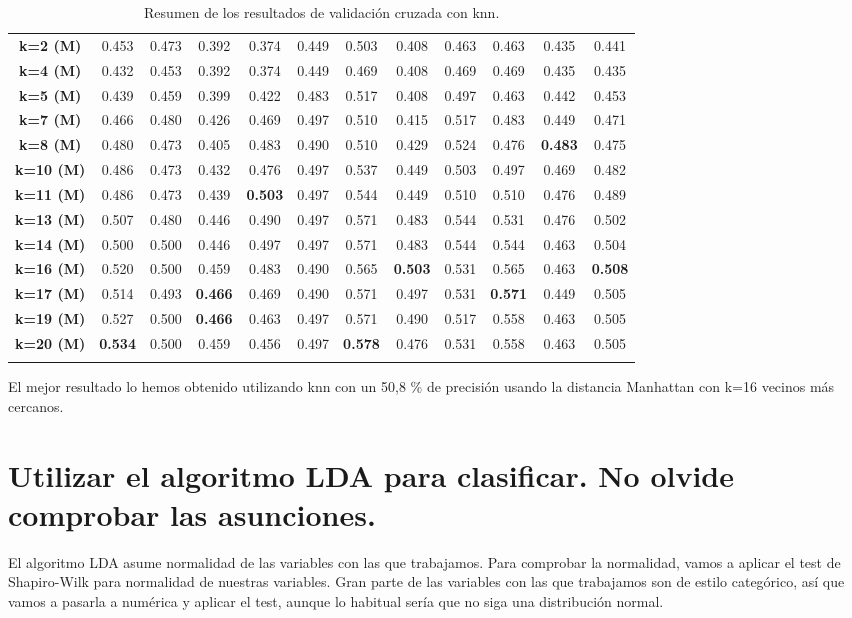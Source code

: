 \documentclass[a4paper,12pt, oneside]{book}
\begin{document}
\begin{longtable}{@{}cccccccccccc@{}}
\\
\textbf{k=2 (M)}   & 0.453 & 0.473 & 0.392 & 0.374 & 0.449 & 0.503 & 0.408 & 0.463 & 0.463 & 0.435 & 0.441
\\
\textbf{k=4 (M)}  & 0.432 & 0.453 & 0.392 & 0.374 & 0.449 & 0.469 & 0.408 & 0.469 & 0.469 & 0.435 & 0.435
 \\
\textbf{k=5 (M)}   & 0.439 & 0.459 & 0.399 & 0.422 & 0.483 & 0.517 & 0.408 & 0.497 & 0.463 & 0.442 & 0.453
\\
\textbf{k=7 (M)}   & 0.466 & 0.480 & 0.426 & 0.469 & 0.497 & 0.510 & 0.415 & 0.517 & 0.483 & 0.449 & 0.471
\\
\textbf{k=8 (M)}   & 0.480 & 0.473 & 0.405 & 0.483 & 0.490 & 0.510 & 0.429 & 0.524 & 0.476 & \textbf{0.483} & 0.475
\\
\textbf{k=10 (M)}  & 0.486 & 0.473 & 0.432 & 0.476 & 0.497 & 0.537 & 0.449 & 0.503 & 0.497 & 0.469 & 0.482
 \\
\textbf{k=11 (M)}   & 0.486 & 0.473 & 0.439 & \textbf{0.503} & 0.497 & 0.544 & 0.449 & 0.510 & 0.510 & 0.476 & 0.489
\\
\textbf{k=13 (M)}   & 0.507 & 0.480 & 0.446 & 0.490 & 0.497 & 0.571 & 0.483 & 0.544 & 0.531 & 0.476 & 0.502
\\
\textbf{k=14 (M)}  & 0.500 & 0.500 & 0.446 & 0.497 & 0.497 & 0.571 & 0.483 & 0.544 & 0.544 & 0.463 & 0.504
 \\
\textbf{k=16 (M)}  & 0.520 & 0.500 & 0.459 & 0.483 & 0.490 & 0.565 & \textbf{0.503} & 0.531 & 0.565 & 0.463 & \textbf{0.508}
 \\
\textbf{k=17 (M)}   & 0.514 & 0.493 & \textbf{0.466} & 0.469 & 0.490 & 0.571 & 0.497 & 0.531 & \textbf{0.571} & 0.449 & 0.505
\\
\textbf{k=19 (M)}   & 0.527 & 0.500 & \textbf{0.466} & 0.463 & 0.497 & 0.571 & 0.490 & 0.517 & 0.558 & 0.463 & 0.505
\\
\textbf{k=20 (M)}  & \textbf{0.534} & 0.500 & 0.459 & 0.456 & 0.497 & \textbf{0.578} & 0.476 & 0.531 & 0.558 & 0.463 & 0.505 \\* \bottomrule
\caption{Resumen de los resultados de validación cruzada con knn.}
\label{tab:knnclass}\\


\end{longtable}
\normalsize
El mejor resultado lo hemos obtenido utilizando knn con un 50,8 \% de precisión usando la distancia Manhattan con k=16 vecinos más cercanos.

\section[LDA para clasificación.]{Utilizar el algoritmo LDA para clasificar. No olvide comprobar las asunciones.}
El algoritmo LDA asume normalidad de las variables con las que trabajamos. Para comprobar la normalidad, vamos a aplicar el test de Shapiro-Wilk para normalidad de nuestras variables. Gran parte de las variables con las que trabajamos son de estilo categórico, así que vamos a pasarla a numérica y aplicar el test, aunque lo habitual sería que no siga una distribución normal.\\
\end{document}
